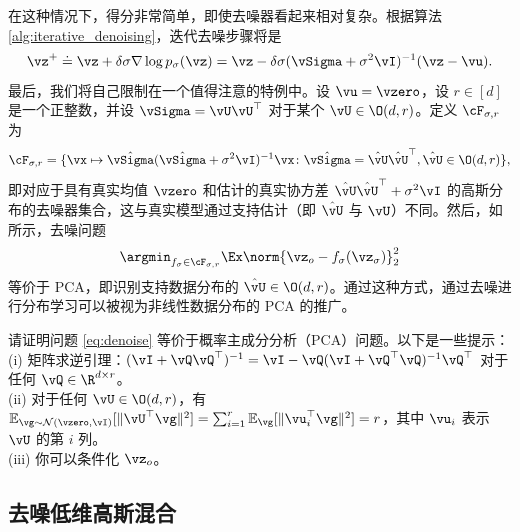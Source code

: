 \documentclass[../../book-main.tex]{subfiles}
\begin{document}
    在这种情况下，得分非常简单，即使去噪器看起来相对复杂。根据算法 \ref{alg:iterative_denoising}，迭代去噪步骤将是
    \begin{equation}
        \vz^{+} \doteq \vz + \delta \sigma \nabla \log p_{\sigma}(\vz) = \vz - \delta \sigma(\vSigma + \sigma^{2}\vI)^{-1}(\vz - \vu).
    \end{equation}
    最后，我们将自己限制在一个值得注意的特例中。设 \(\vu = \vzero\)，设 \(r \in [d]\) 是一个正整数，并设 \(\vSigma = \vU\vU^{\top}\) 对于某个 \(\vU \in \O(d, r)\)。定义 \(\cF_{\sigma, r}\) 为
    \begin{equation}
        \cF_{\sigma, r} = \{\vx \mapsto \hat{\vSigma}(\hat{\vSigma} + \sigma^{2}\vI)^{-1}\vx \colon \hat{\vSigma} = \hat{\vU}\hat{\vU}^{\top}, \hat{\vU} \in \O(d, r)\},
    \end{equation}
    即对应于具有真实均值 \(\vzero\) 和估计的真实协方差 \(\hat{\vU}\hat{\vU}^{\top} + \sigma^{2}\vI\) 的高斯分布的去噪器集合，这与真实模型通过支持估计（即 \(\hat{\vU}\) 与 \(\vU\)）不同。然后，如 \cite{wang2024diffusion} 所示，去噪问题
    \begin{equation}\label{eq:denoise}
        \argmin_{f_{\sigma} \in \cF_{\sigma, r}}\Ex\norm{\vz_{o} - f_{\sigma}(\vz_{\sigma})}_{2}^{2}
    \end{equation}
    等价于 PCA，即识别支持数据分布的 \(\hat{\vU} \in \O(d, r)\)。通过这种方式，通过去噪进行分布学习可以被视为非线性数据分布的 PCA 的推广。

\begin{exercise}
请证明问题 \eqref{eq:denoise} 等价于概率主成分分析（PCA）问题。以下是一些提示： \\
(i) 矩阵求逆引理：$(\vI + \vQ\vQ^\top)^{-1} = \vI - \vQ(\vI + \vQ^\top\vQ)^{-1}\vQ^\top$ 对于任何 $\vQ \in \R^{d\times r}$。 \\
(ii) 对于任何 $\vU \in \O(d, r)$，有 $\mathbb{E}_{\vg \sim \mathcal{N}(\vzero, \vI)}[\|\vU^\top \vg\|^2] = \sum_{i=1}^r \mathbb{E}_{\vg}[\|\vu_i^\top\vg\|^2] = r$，其中 $\vu_i$ 表示 $\vU$ 的第 $i$ 列。 \\
(iii) 你可以条件化 $\vz_o$。
\end{exercise}

\subsection{去噪低维高斯混合}
\end{document}
